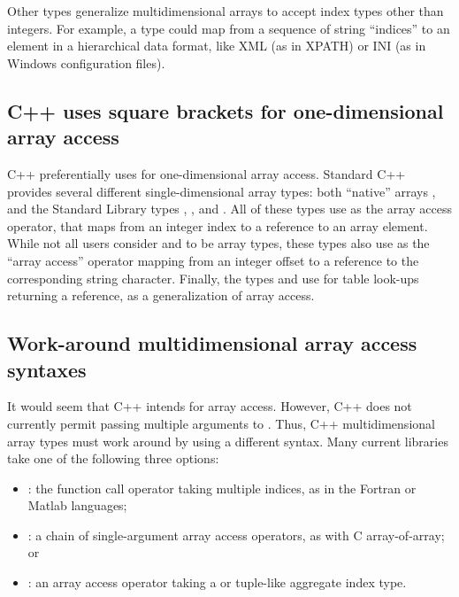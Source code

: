 \documentclass{wg21}
\begin{document}
Other types generalize multidimensional arrays to accept index types other than integers.
For example, a type could map from a sequence of string ``indices'' to an element in a hierarchical data format,
like XML (as in XPATH) or INI (as in Windows configuration files).

\subsection{C++ uses square brackets for one-dimensional array access}

C++ preferentially uses  for one-dimensional array access.  Standard C++ provides several different single-dimensional array types: both ``native'' arrays , and the Standard Library types , , and .  All of these types use  as the array access operator, that maps from an integer index to a reference to an array element.  While not all users consider  and  to be array types, these types also use  as the ``array access'' operator mapping from an integer offset to a reference to the corresponding string character.  Finally, the types  and  use  for table look-ups returning a reference, as a generalization of array access.

\subsection{Work-around multidimensional array access syntaxes}

It would seem that C++ intends  for array access.  However, C++ does not currently permit passing multiple arguments to .  Thus, C++ multidimensional array types must work around by using a different syntax.  Many current libraries take one of the following three options:

\begin{itemize}
\item {}: the function call operator taking multiple indices, as in the Fortran or Matlab languages;
\item {}: a chain of single-argument array access operators, as with C array-of-array; or
\item {}: an array access operator taking a  or tuple-like aggregate index type.
\end{itemize}
\end{document}
